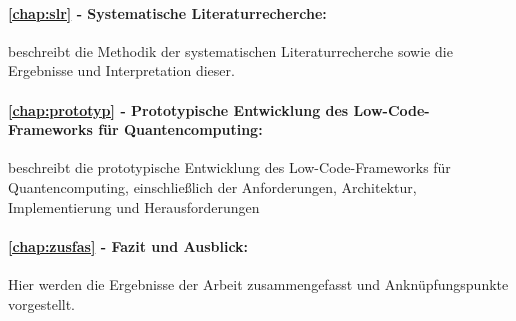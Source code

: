 \paragraph{\cref{chap:slr} - Systematische Literaturrecherche:} beschreibt die Methodik der systematischen Literaturrecherche sowie die Ergebnisse 
und Interpretation dieser.
\paragraph{\cref{chap:prototyp} - Prototypische Entwicklung des Low-Code-Frameworks für Quantencomputing:} beschreibt die prototypische 
Entwicklung des Low-Code-Frameworks für Quantencomputing, einschließlich der Anforderungen, Architektur, Implementierung und Herausforderungen
\paragraph{\cref{chap:zusfas} - Fazit und Ausblick:} Hier werden die Ergebnisse der Arbeit zusammengefasst und Anknüpfungspunkte vorgestellt.


